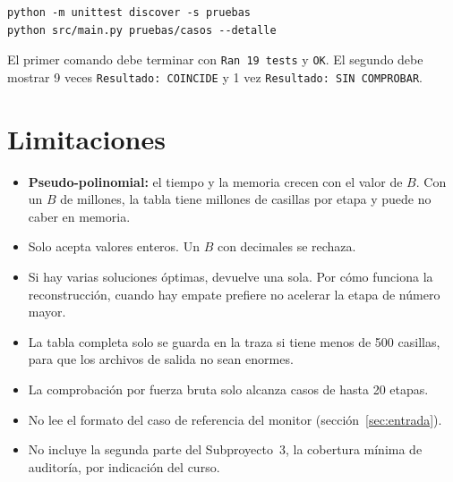 \documentclass[11pt,a4paper]{article}
\newcommand{\cod}[1]{\texttt{#1}}
\begin{document}
\begin{lstlisting}
python -m unittest discover -s pruebas
python src/main.py pruebas/casos --detalle
\end{lstlisting}

El primer comando debe terminar con \cod{Ran 19 tests} y \cod{OK}. El segundo debe mostrar 9 veces \cod{Resultado: COINCIDE} y 1 vez \cod{Resultado: SIN COMPROBAR}.

\section{Limitaciones}
\label{sec:limitaciones}

\begin{itemize}
  \item \textbf{Pseudo-polinomial:} el tiempo y la memoria crecen con el valor de $B$. Con un $B$ de millones, la tabla tiene millones de casillas por etapa y puede no caber en memoria.
  \item Solo acepta valores enteros. Un $B$ con decimales se rechaza.
  \item Si hay varias soluciones óptimas, devuelve una sola. Por cómo funciona la reconstrucción, cuando hay empate prefiere no acelerar la etapa de número mayor.
  \item La tabla completa solo se guarda en la traza si tiene menos de 500 casillas, para que los archivos de salida no sean enormes.
  \item La comprobación por fuerza bruta solo alcanza casos de hasta 20 etapas.
  \item No lee el formato del caso de referencia del monitor (sección~\ref{sec:entrada}).
  \item No incluye la segunda parte del Subproyecto~3, la cobertura mínima de auditoría, por indicación del curso.
\end{itemize}
\end{document}

